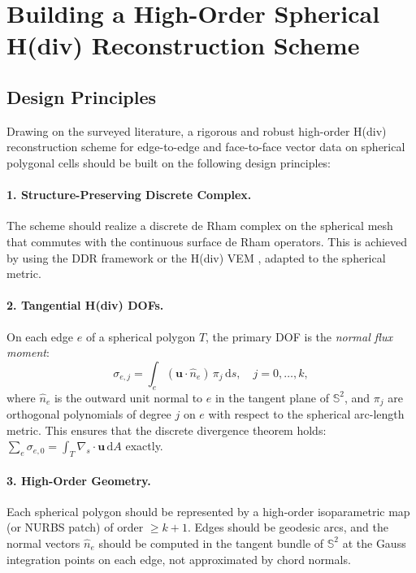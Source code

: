 \section{Building a High-Order Spherical H(div) Reconstruction Scheme}

\subsection{Design Principles}

Drawing on the surveyed literature, a rigorous and robust high-order
H(div) reconstruction scheme for edge-to-edge and face-to-face vector
data on spherical polygonal cells should be built on the following
design principles:

\paragraph{1. Structure-Preserving Discrete Complex.}
The scheme should realize a discrete de Rham complex on the spherical mesh
that commutes with the continuous surface de Rham operators. This is achieved
by using the DDR framework \cite{dipietroDDR2021,dipietroManifold2024} or the
H(div) VEM \cite{veigaHdivVEM2016}, adapted to the spherical metric.

\paragraph{2. Tangential H(div) DOFs.}
On each edge $e$ of a spherical polygon $T$, the primary DOF is the
\emph{normal flux moment}:
\[
  \sigma_{e,j} = \int_e (\mathbf{u}\cdot\hat{n}_e)\,\pi_j\,\mathrm{d}s,
  \quad j = 0,\ldots,k,
\]
where $\hat{n}_e$ is the outward unit normal to $e$ in the tangent plane of
$\mathbb{S}^2$, and $\pi_j$ are orthogonal polynomials of degree $j$ on
$e$ with respect to the spherical arc-length metric. This ensures that the
discrete divergence theorem holds: $\sum_e \sigma_{e,0} = \int_T \nabla_s
\cdot \mathbf{u}\,\mathrm{d}A$ exactly.

\paragraph{3. High-Order Geometry.}
Each spherical polygon should be represented by a high-order isoparametric
map (or NURBS patch) of order $\geq k+1$. Edges should be geodesic arcs,
and the normal vectors $\hat{n}_e$ should be computed in the tangent bundle
of $\mathbb{S}^2$ at the Gauss integration points on each edge, not
approximated by chord normals.

